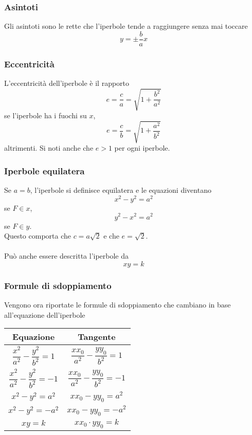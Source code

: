 \subsubsection{Asintoti}
Gli asintoti sono le rette che l'iperbole tende a raggiungere senza mai toccare
\begin{equation*}
  y=\pm\frac{b}{a}x
\end{equation*}

\subsubsection{Eccentricità}
L'eccentricità dell'iperbole è il rapporto
\begin{equation*}
  e=\frac{c}{a}=\sqrt{1+\frac{b^2}{a^2}}
\end{equation*}
se l'iperbole ha i fuochi su $x$,
\begin{equation*}
  e = \frac{c}{b}=\sqrt{1+\frac{a^2}{b^2}}
\end{equation*}
altrimenti. Si noti anche che $e > 1$ per ogni iperbole.

\subsubsection{Iperbole equilatera}
Se $a=b$, l'iperbole si definisce equilatera e le equazioni diventano 
\begin{equation*}
  x^2-y^2=a^2
\end{equation*}
se $F\in x$,
\begin{equation*}
  y^2-x^2=a^2
\end{equation*}
se $F\in y$.\\
Questo comporta che $c = a\sqrt{2}$ e che $e=\sqrt{2}$.\\\\
Può anche essere descritta l'iperbole da
\begin{equation*}
  xy=k
\end{equation*}

\subsubsection{Formule di sdoppiamento}
Vengono ora riportate le formule di sdoppiamento che cambiano in base all'equazione dell'iperbole
\begin{center}
  \begin{tabular}{c|c}
    Equazione & Tangente\\\hline
    $\dfrac{x^2}{a^2}-\dfrac{y^2}{b^2}=1$ & $\dfrac{xx_0}{a^2}-\dfrac{yy_0}{b^2}=1$\\\hline
    $\dfrac{x^2}{a^2}-\dfrac{y^2}{b^2}=-1$ & $\dfrac{xx_0}{a^2}-\dfrac{yy_0}{b^2}=-1$\\\hline
    $x^2-y^2=a^2$ & $xx_0-yy_0=a^2$\\\hline
    $x^2-y^2=-a^2$ & $xx_0-yy_0=-a^2$\\\hline
    $xy=k$ & $xx_0\cdot yy_0=k$
  \end{tabular}
\end{center}

